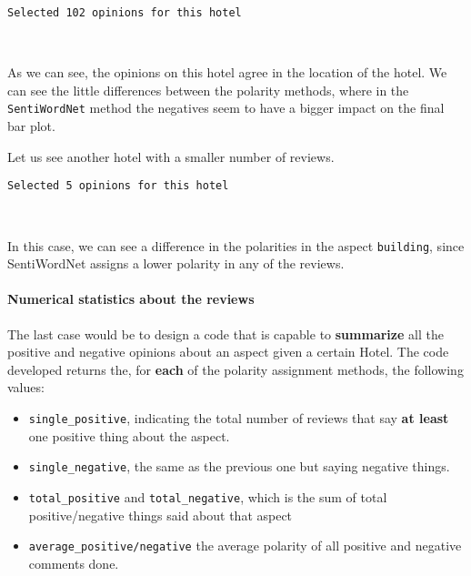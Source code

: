 \documentclass[11pt]{article}
\providecommand{\tightlist}{%
      \setlength{\itemsep}{0pt}\setlength{\parskip}{0pt}}
\begin{document}
\begin{Verbatim}[commandchars=\\\{\}]
    Selected 102 opinions for this hotel
\end{Verbatim}

\begin{center}
\end{center}
{ \hspace*{\fill} \\}

As we can see, the opinions on this hotel agree in the location of the
hotel. We can see the little differences between the polarity methods,
where in the \texttt{SentiWordNet} method the negatives seem to have a
bigger impact on the final bar plot.

Let us see another hotel with a smaller number of reviews.


\begin{Verbatim}[commandchars=\\\{\}]
    Selected 5 opinions for this hotel
\end{Verbatim}

\begin{center}
\end{center}
{ \hspace*{\fill} \\}

In this case, we can see a difference in the polarities in the aspect
\texttt{building}, since SentiWordNet assigns a lower polarity in any of
the reviews.

\hypertarget{numerical-statistics-about-the-reviews}{%
    \paragraph{Numerical statistics about the
        reviews}\label{numerical-statistics-about-the-reviews}}

The last case would be to design a code that is capable to
\textbf{summarize} all the positive and negative opinions about an
aspect given a certain Hotel. The code developed returns the, for
\textbf{each} of the polarity assignment methods, the following values:

\begin{itemize}
    \tightlist
    \item
          \texttt{single\_positive}, indicating the total number of reviews that
          say \textbf{at least} one positive thing about the aspect.
    \item
          \texttt{single\_negative}, the same as the previous one but saying
          negative things.
    \item
          \texttt{total\_positive} and \texttt{total\_negative}, which is the
          sum of total positive/negative things said about that aspect
    \item
          \texttt{average\_positive/negative} the average polarity of all
          positive and negative comments done.
\end{itemize}
\end{document}
